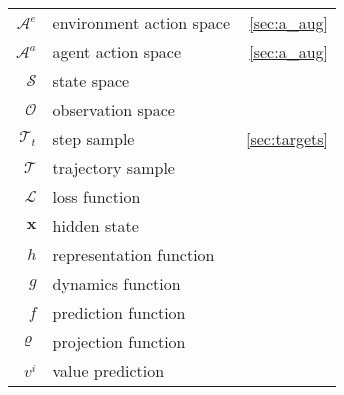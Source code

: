 \begin{tabular}{| r  l  r |}
    $\mathcal{A}^e$ & environment action space               & \ref{sec:a_aug}                          \\
    $\mathcal{A}^a$ & agent action space                     & \ref{sec:a_aug}                          \\
    $\mathcal{S}$   & state space                                                                       \\
    $\mathcal{O}$   & observation space                                                                 \\
    $\mathcal{T}_t$ & step sample                            & \ref{sec:targets}                        \\
    $\mathcal{T}$   & trajectory sample                                                                 \\
    $\mathcal{L}$   & loss function                                                                     \\

    \hline
    $\mathbf{x}$    & hidden state                                                                      \\
    $h$             & representation function                                                           \\
    $g$             & dynamics function                                                                 \\
    $f$             & prediction function                                                               \\
    $\varrho$       & projection function                                                               \\
    $v^i$           & value prediction                                                                  \\


\end{tabular}
